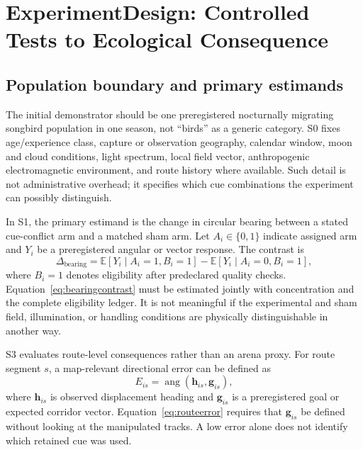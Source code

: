 \documentclass[conference]{IEEEtran}
\begin{document}
\section{ExperimentDesign: Controlled Tests to Ecological Consequence}\label{sec:design}
\subsection{Population boundary and primary estimands}
The initial demonstrator should be one preregistered nocturnally migrating songbird population in one season, not ``birds'' as a generic category. S0 fixes age/experience class, capture or observation geography, calendar window, moon and cloud conditions, light spectrum, local field vector, anthropogenic electromagnetic environment, and route history where available. Such detail is not administrative overhead; it specifies which cue combinations the experiment can possibly distinguish.

In S1, the primary estimand is the change in circular bearing between a stated cue-conflict arm and a matched sham arm. Let $A_i\in\{0,1\}$ indicate assigned arm and $Y_i$ be a preregistered angular or vector response. The contrast is
\begin{equation}
\Delta_{\mathrm{bearing}}=\mathbb{E}\left[Y_i\mid A_i=1,B_i=1\right]-\mathbb{E}\left[Y_i\mid A_i=0,B_i=1\right],
\label{eq:bearingcontrast}
\end{equation}
where $B_i=1$ denotes eligibility after predeclared quality checks. Equation~\eqref{eq:bearingcontrast} must be estimated jointly with concentration and the complete eligibility ledger. It is not meaningful if the experimental and sham field, illumination, or handling conditions are physically distinguishable in another way.

S3 evaluates route-level consequences rather than an arena proxy. For route segment $s$, a map-relevant directional error can be defined as
\begin{equation}
E_{is}=\operatorname{ang}\left(\mathbf{h}_{is},\mathbf{g}_{is}\right),
\label{eq:routeerror}
\end{equation}
where $\mathbf{h}_{is}$ is observed displacement heading and $\mathbf{g}_{is}$ is a preregistered goal or expected corridor vector. Equation~\eqref{eq:routeerror} requires that $\mathbf{g}_{is}$ be defined without looking at the manipulated tracks. A low error alone does not identify which retained cue was used.
\end{document}
